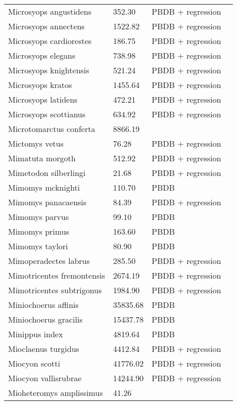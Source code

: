 \documentclass{article}
\begin{document}
\begin{center}
\begin{longtable}{p{} p{} p{} p{}}
    Microsyops angustidens & 352.30 & PBDB + regression &  \\ 
    Microsyops annectens & 1522.82 & PBDB + regression &  \\ 
    Microsyops cardiorestes & 186.75 & PBDB + regression &  \\ 
    Microsyops elegans & 738.98 & PBDB + regression &  \\ 
    Microsyops knightensis & 521.24 & PBDB + regression &  \\ 
    Microsyops kratos & 1455.64 & PBDB + regression &  \\ 
    Microsyops latidens & 472.21 & PBDB + regression &  \\ 
    Microsyops scottianus & 634.92 & PBDB + regression &  \\ 
    Microtomarctus conferta & 8866.19 & \cite{Tomiya2013} &  \\ 
    Mictomys vetus & 76.28 & PBDB + regression &  \\ 
    Mimatuta morgoth & 512.92 & PBDB + regression &  \\ 
    Mimetodon silberlingi & 21.68 & PBDB + regression &  \\ 
    Mimomys mcknighti & 110.70 & PBDB &  \\ 
    Mimomys panacaensis & 84.39 & PBDB + regression &  \\ 
    Mimomys parvus & 99.10 & PBDB &  \\ 
    Mimomys primus & 163.60 & PBDB &  \\ 
    Mimomys taylori & 80.90 & PBDB &  \\ 
    Mimoperadectes labrus & 285.50 & PBDB + regression &  \\ 
    Mimotricentes fremontensis & 2674.19 & PBDB + regression &  \\ 
    Mimotricentes subtrigonus & 1984.90 & PBDB + regression &  \\ 
    Miniochoerus affinis & 35835.68 & PBDB &  \\ 
    Miniochoerus gracilis & 15437.78 & PBDB &  \\ 
    Minippus index & 4819.64 & PBDB &  \\ 
    Mioclaenus turgidus & 4412.84 & PBDB + regression &  \\ 
    Miocyon scotti & 41776.02 & PBDB + regression &  \\ 
    Miocyon vallisrubrae & 14244.90 & PBDB + regression &  \\ 
    Mioheteromys amplissimus & 41.26 & \cite{Tomiya2013} &  \\ 

\end{longtable}
\end{center}
\end{document}
